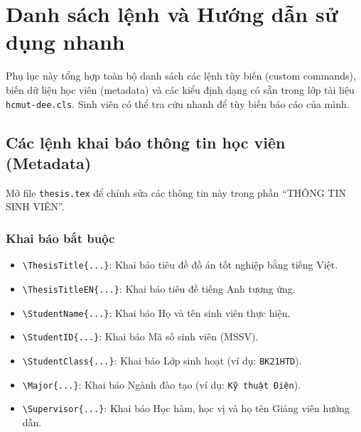 
\chapter{Danh sách lệnh và Hướng dẫn sử dụng nhanh}
\label{app:commands-guide}

Phụ lục này tổng hợp toàn bộ danh sách các lệnh tùy biến (custom commands), biến dữ liệu học viên (metadata) và các kiểu định dạng có sẵn trong lớp tài liệu \texttt{hcmut-dee.cls}. Sinh viên có thể tra cứu nhanh để tùy biến báo cáo của mình.

\section{Các lệnh khai báo thông tin học viên (Metadata)}

Mở file \texttt{thesis.tex} để chỉnh sửa các thông tin này trong phần ``THÔNG TIN SINH VIÊN''.

\subsection{Khai báo bắt buộc}
\begin{itemize}
  \item \verb|\ThesisTitle{...}|: Khai báo tiêu đề đồ án tốt nghiệp bằng tiếng Việt.
  \item \verb|\ThesisTitleEN{...}|: Khai báo tiêu đề tiếng Anh tương ứng.
  \item \verb|\StudentName{...}|: Khai báo Họ và tên sinh viên thực hiện.
  \item \verb|\StudentID{...}|: Khai báo Mã số sinh viên (MSSV).
  \item \verb|\StudentClass{...}|: Khai báo Lớp sinh hoạt (ví dụ: \texttt{BK21HTD}).
  \item \verb|\Major{...}|: Khai báo Ngành đào tạo (ví dụ: \texttt{Kỹ thuật Điện}).
  \item \verb|\Supervisor{...}|: Khai báo Học hàm, học vị và họ tên Giảng viên hướng dẫn.
\end{itemize}

